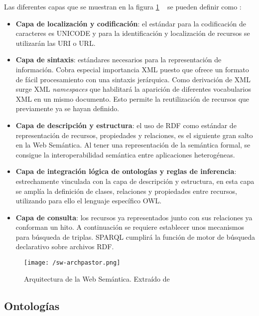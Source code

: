 Las diferentes capas que se muestran en la figura \ref{fig:swarch} ~\cite{PASTOR} se pueden
definir como :

\begin{itemize}
\item \textbf{Capa de localización y codificación}: el estándar para la
  codificación de caracteres es UNICODE y para la identificación y localización
  de recursos se utilizarán las \acs{URI} o \acs{URL}.
\item \textbf{Capa de sintaxis}: estándares necesarios para la representación de
  información. Cobra especial importancia \acs{XML} puesto que ofrece un formato
  de fácil procesamiento con una sintaxis jerárquica. Como derivación de
  \acs{XML} surge \acs{XML} \textit{namespaces} que habilitará la aparición de
  diferentes vocabularios \acs{XML} en un mismo documento. Esto permite la
  reutilización de recursos que previamente ya se hayan definido. 
\item \textbf{Capa de descripción y estructura}: el uso de \acs{RDF} como
  estándar de representación de recursos, propiedades y relaciones, es el
  siguiente gran salto en la Web Semántica. Al tener una representación de la
  semántica formal, se consigue la interoperabilidad semántica entre
  aplicaciones heterogéneas. 
\item \textbf{Capa de integración lógica de ontologías y reglas de inferencia}:
  estrechamente vinculada con la capa de descripción y estructura, en esta capa se
  amplía la definición de clases, relaciones y propiedades entre recursos,
  utilizando para ello el lenguaje específico \acs{OWL}.
\item \textbf{Capa de consulta}: los recursos ya representados junto con sus
  relaciones ya conforman un hito. A continuación se requiere establecer unos
  mecanismos para búsqueda de triplas. \acs{SPARQL} cumplirá la función de motor
  de búsqueda declarativo sobre archivos \acs{RDF}. 

\end{itemize}


\begin{figure}[!h]
  \begin{center}
    \texttt{[image: /sw-archpastor.png]} 
    \caption{Arquitectura de la Web Semántica. Extraído de \cite{PASTOR}}
    \label{fig:swarch}
  \end{center}
\end{figure}

\subsection{Ontologías}
\label{sbs:ontologia}

